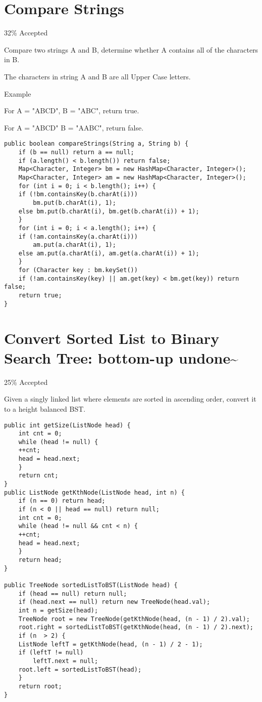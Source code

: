 \documentclass[12pt]{book}
\begin{document}
\chapter{Compare Strings}
\label{sec-23}

32\% Accepted

Compare two strings A and B, determine whether A contains all of the characters in B.

The characters in string A and B are all Upper Case letters.

Example

For A = "ABCD", B = "ABC", return true.

For A = "ABCD" B = "AABC", return false.
\lstset{language=java,label= ,caption= ,numbers=none}
\begin{lstlisting}
public boolean compareStrings(String a, String b) {
    if (b == null) return a == null;
    if (a.length() < b.length()) return false;
    Map<Character, Integer> bm = new HashMap<Character, Integer>();
    Map<Character, Integer> am = new HashMap<Character, Integer>();
    for (int i = 0; i < b.length(); i++) {
	if (!bm.containsKey(b.charAt(i)))
	    bm.put(b.charAt(i), 1);
	else bm.put(b.charAt(i), bm.get(b.charAt(i)) + 1);
    }
    for (int i = 0; i < a.length(); i++) {
	if (!am.containsKey(a.charAt(i)))
	    am.put(a.charAt(i), 1);
	else am.put(a.charAt(i), am.get(a.charAt(i)) + 1);
    }
    for (Character key : bm.keySet()) 
	if (!am.containsKey(key) || am.get(key) < bm.get(key)) return false;
    return true;
}
\end{lstlisting}
\chapter{Convert Sorted List to Binary Search Tree: bottom-up undone\textasciitilde{}~}
\label{sec-24}

25\% Accepted

Given a singly linked list where elements are sorted in ascending order, convert it to a height balanced BST.
\lstset{language=java,label= ,caption= ,numbers=none}
\begin{lstlisting}
public int getSize(ListNode head) {
    int cnt = 0;
    while (head != null) {
	++cnt;
	head = head.next;
    }
    return cnt;
}
public ListNode getKthNode(ListNode head, int n) {
    if (n == 0) return head;
    if (n < 0 || head == null) return null;
    int cnt = 0;
    while (head != null && cnt < n) {
	++cnt;
	head = head.next;
    }
    return head;
}

public TreeNode sortedListToBST(ListNode head) {
    if (head == null) return null;
    if (head.next == null) return new TreeNode(head.val);
    int n = getSize(head);
    TreeNode root = new TreeNode(getKthNode(head, (n - 1) / 2).val);
    root.right = sortedListToBST(getKthNode(head, (n - 1) / 2).next);
    if (n  > 2) {
	ListNode leftT = getKthNode(head, (n - 1) / 2 - 1);  
	if (leftT != null) 
	    leftT.next = null;
	root.left = sortedListToBST(head);
    }
    return root;
}
\end{lstlisting}
\end{document}
